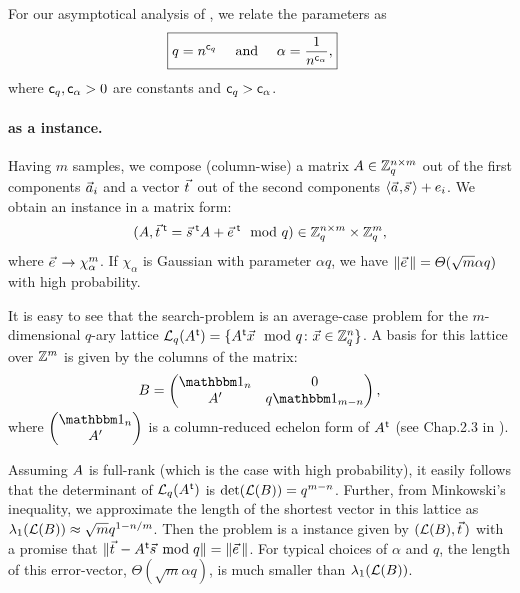 For our asymptotical analysis of \LWE, we relate the parameters as
\begin{align}
	\Aboxed{\vspace{15pt} q = n^{\cq} \quad \text{ and } \quad \alpha = \frac{1}{n^{\ca}}, }
\end{align}
where $\mathsf{c}_q, \mathsf{c}_{\alpha} >0$ are constants and $\mathsf{c}_q > \mathsf{c}_{\alpha}$. 

\paragraph{\LWE as a \BDD instance.} Having $m$ \LWE samples, we compose (column-wise) a matrix $A \in {{\mathbb Z}}_q^{n \times m}$ out of the first components $\vec a_i$ and a vector $\tvec$ out of the second components $\ScProd{\avec}{\svec}+e_i$. We obtain an \LWE instance in a matrix form:
\begin{align*} \label{eq:LWEMatrixForm}
	(\AMat, \tvec\transpose = \svec\transpose \AMat + \evec\transpose \mod q) \in \Z_q^{n \times m} \times \Z_q^m,
\end{align*}
where $\evec \rightarrow \chi_{\alpha}^m$. If $\chi_{\alpha}$ is Gaussian with parameter $\alpha q$, we have $\| \evec \| = \TLandau(\sqrt{m} \alpha q)$ with high probability.

It is easy to see that the search-\LWE problem is an average-case \BDD problem for the $m$-dimensional $q$-ary lattice $\mathcal{L}_q(A\mkern0.7mu^{\mathsf{ t}}) = \{ A\mkern0.7mu^{\mathsf{ t}} \vec x \mod q \colon \vec x \in {{\mathbb Z}}_q^n \}$. A basis for this lattice over ${{\mathbb Z}}^m$ is given by the columns of the matrix:
\begin{equation} \label{eq:LWEBasis}
	\BMat = \begin{pmatrix}
		\Id_{n} & 0 \\
		 \AMat' & q\Id_{m-n}
	\end{pmatrix},
\end{equation}
where $\smash[t]{\begin{pmatrix}  \Id_{n} \\ \AMat' \end{pmatrix}}$ is a column-reduced echelon form of $A\mkern0.7mu^{\mathsf{ t}}$ (see Chap.\@ 2.3 in \cite{Cohen95}). 

Assuming $A$ is full-rank (which is the case with high probability), it easily follows that the determinant of $\mathcal{L}_q(A\mkern0.7mu^{\mathsf{ t}})$ is $\det(\mathcal{L}(B)) = q^{m-n}$. Further, from Minkowski's inequality, we approximate the length of the shortest vector in this lattice as $\lambda_1 (\mathcal{L}(B)) \approx \sqrt{m} q^{1-n/m}$.
Then the \LWE problem is a \BDD instance given by $(\Lat(\BMat), \tvec)$ with a promise that $\| \tvec - \AMat\transpose \svec \bmod q\| = \| \evec \|$. For typical choices of $\alpha$ and $q$, the length of this error-vector, $\Theta(\sqrt{m} \alpha q)$, is much smaller than $\lambda_1(\mathcal{L}(B))$. 